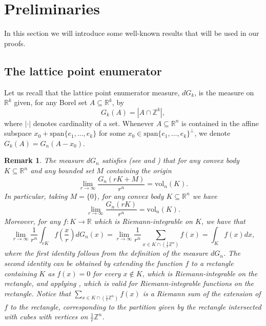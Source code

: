 \documentclass[10pt]{amsart}
\newtheorem{rmk}[thm]{Remark}
\def\R{\mathbb{R}}
\def\Z{\mathbb{Z}}
\def\vol{\mathrm{vol}}
\numberwithin{equation}{section}
\begin{document}
\section{Preliminaries}\label{sec:Preliminaries}

In this section we will introduce some well-known results that will be used in our proofs.

\subsection{The lattice point enumerator}\label{subsec:LatticePoint enumerator}
Let us recall that the lattice point enumerator measure, $dG_k$, is the measure on $\R^k$ given, for any Borel set $A\subseteq\R^k$, by
$$
G_k(A)=|A\cap\Z^k|,
$$
where $|\cdot|$ denotes cardinality of a set. Whenever $A\subseteq\R^n$ is contained in the affine subspace $x_0+\textrm{span}\{e_1,\dots,e_k\}$ for some $x_0\in\textrm{span}\{e_1,\dots,e_k\}^\perp$, we denote $G_k(A)=G_n(A-x_0)$.

\begin{rmk}\label{rmk:ApproachingVolByDilationsWithGApproachingIntegralWithG}
The measure  $dG_n$ satisfies (see \cite[Lemma 3.22]{TV} and \cite[Section 3.1]{ALY}) that for any convex body $K\subseteq\R^n$ and any bounded set $M$ containing the origin
\begin{equation}\label{eq:ApproachingVolByDilationsWithG}
\lim_{r\to\infty}\frac{G_n(rK+M)}{r^n}=\vol_n(K).
\end{equation}
In particular, taking $M=\{0\}$, for any convex body $K\subseteq\R^n$ we have
\begin{equation}\label{eq:ApproachingVolByDilationsWithGM=0}
\lim_{r\to\infty}\frac{G_n(rK)}{r^n}=\vol_n(K).
\end{equation}
Moreover, for any $f:K\to\R$ which is Riemann-integrable on $K$, we have that
\begin{equation}\label{eq:ApproachingIntegralWithG}
\lim_{r\to\infty}\frac{1}{r^n}\int_{ r K}f\left(\frac{x}{r}\right)dG_n(x)=\lim_{r\to\infty}\frac{1}{r^n}\sum_{x\in K\cap\left(\frac{1}{r}\Z^n\right)}f(x)=\int_{K}f(x)dx,
\end{equation}
where the first identity follows from the definition of the measure $dG_n$. The second identity can be obtained by extending the function $f$ to a rectangle containing $K$ as $f(x)=0$ for every $x\not\in K$, which is Riemann-integrable on the rectangle, and applying \cite[Proposition 6.3]{CS}, which is valid for Riemann-integrable functions on the rectangle. Notice that $\displaystyle{\sum_{x\in K\cap\left(\frac{1}{r}\Z^n\right)}f(x)}$ is a Riemann sum of the extension of $f$ to the rectangle, corresponding to the partition given by the rectangle intersected with cubes with vertices on $\frac{1}{r}\Z^n$.
\end{rmk}
\end{document}
